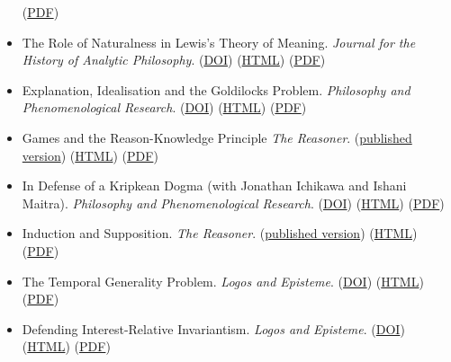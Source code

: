 \documentclass[
  10pt,
  letterpaper,
  DIV=11,
  numbers=noendperiod,
  twoside]{scrartcl}
\begin{document}
\begin{itemize}
  (\href{./posts/ross-sleeping-beauty/Ross\%20on\%20Sleeping\%20Beauty.pdf}{PDF})
\item
  The Role of Naturalness in Lewis's Theory of Meaning. \emph{Journal
  for the History of Analytic Philosophy}.
  (\href{http://dx.doi.org/10.4148/jhap.v1i10.1620}{DOI})
  (\href{./posts/naturalness/the-role-of-naturalness-in-lewiss-theory-of-meaning.html}{HTML})
  (\href{./posts/naturalness/The\%20Role\%20of\%20Naturalness\%20in\%20Lewis's\%20Theory\%20of\%20Meaning.pdf}{PDF})
\item
  Explanation, Idealisation and the Goldilocks Problem. \emph{Philosophy
  and Phenomenological Research}.
  (\href{http://dx.doi.org/10.1111/j.1933-1592.2011.00574.x}{DOI})
  (\href{./posts/eigp/goldilocks.html}{HTML})
  (\href{./posts/eigp/Explanation,\%20Idealisation\%20and\%20the\%20Goldilocks\%20Problem.pdf}{PDF})
\item
  Games and the Reason-Knowledge Principle \emph{The Reasoner}.
  (\href{http://www.kent.ac.uk/secl/philosophy/jw/TheReasoner/vol6/TheReasoner-6(1).pdf}{published
  version})
  (\href{./posts/gark/games-and-the-reason-knowledge-principle.html}{HTML})
  (\href{./posts/gark/Games\%20and\%20the\%20Reason-Knowledge\%20Principle.pdf}{PDF})
\item
  In Defense of a Kripkean Dogma (with Jonathan Ichikawa and Ishani
  Maitra). \emph{Philosophy and Phenomenological Research}.
  (\href{http://dx.doi.org/10.1111/j.1933-1592.2010.00478.x}{DOI})
  (\href{./posts/idakd/in-defense-of-a-kripkean-dogma.html}{HTML})
  (\href{./posts/idakd/In\%20Defense\%20of\%20a\%20Kripkean\%20Dogma.pdf}{PDF})
\item
  Induction and Supposition. \emph{The Reasoner}.
  (\href{http://www.kent.ac.uk/secl/philosophy/jw/TheReasoner/vol6/TheReasoner-6(5).pdf}{published
  version}) (\href{./posts/ias/induction-and-supposition.html}{HTML})
  (\href{./posts/ias/Induction\%20and\%20Supposition.pdf}{PDF})
\item
  The Temporal Generality Problem. \emph{Logos and Episteme}.
  (\href{http://dx.doi.org/10.5840/logos-episteme20123153}{DOI})
  (\href{./posts/tgp/the-temporal-generality-problem.html}{HTML})
  (\href{./posts/tgp/The\%20Temporal\%20Generality\%20Problem.pdf}{PDF})
\item
  Defending Interest-Relative Invariantism. \emph{Logos and Episteme}.
  (\href{http://dx.doi.org/10.5840/logos-episteme2011248}{DOI})
  (\href{./posts/diri/defending-interest-relative-invariantism.html}{HTML})
  (\href{./posts/diri/Defending\%20Interest\%20Relative\%20Invariantism.pdf}{PDF})

\end{itemize}
\end{document}
